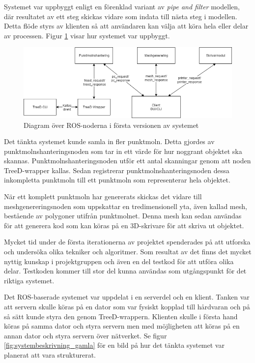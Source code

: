 Systemet var uppbyggt enligt en förenklad variant av \textit{pipe and filter} modellen, där resultatet av ett steg skickas vidare som indata till nästa steg i modellen. Detta flöde styrs av klienten så att användaren kan välja att köra hela eller delar av processen. Figur \ref{fig:noddiagram} visar hur systemet var uppbyggt.

\begin{figure}[H]
	\centering
	\includegraphics[width=130mm]{figures/Noddiagram.png}
	\caption{Diagram över ROS-noderna i första versionen av systemet}
	\label{fig:noddiagram}
\end{figure}

Det tänkta systemet kunde samla in fler punktmoln. Detta gjordes av punktmolnshanteringsnoden som tar in ett värde för hur noggrant objektet ska skannas. Punktmolnshanteringsnoden utför ett antal skanningar genom att noden TreeD-wrapper kallas. Sedan registrerar punktmolnshanteringsnoden dessa inkompletta punktmoln till ett punktmoln som representerar hela objektet.

När ett komplett punktmoln har genererats skickas det vidare till meshgenereringsnoden som uppskattar en tredimensionell yta, även kallad mesh, bestående av polygoner utifrån punktmolnet. Denna mesh kan sedan användas för att generera kod som kan köras på en 3D-skrivare för att skriva ut objektet.

Mycket tid under de första iterationerna av projektet spenderades på att utforska och undersöka olika tekniker och algoritmer. Som resultat av det finns det mycket nyttig kunskap i projektgruppen och även en del testkod för att utföra olika delar. Testkoden kommer till stor del kunna användas som utgångspunkt för det riktiga systemet.

Det ROS-baserade systemet var uppdelat i en serverdel och en klient. Tanken var att servern skulle köras på en dator som var fysiskt kopplad till hårdvaran och på så sätt kunde styra den genom TreeD-wrappern. Klienten skulle i första hand köras på samma dator och styra servern men med möjligheten att köras på en annan dator och styra servern över nätverket. Se figur \ref{fig:systembeskrivning_gamla} för en bild på hur det tänkta systemet var planerat att vara strukturerat.


